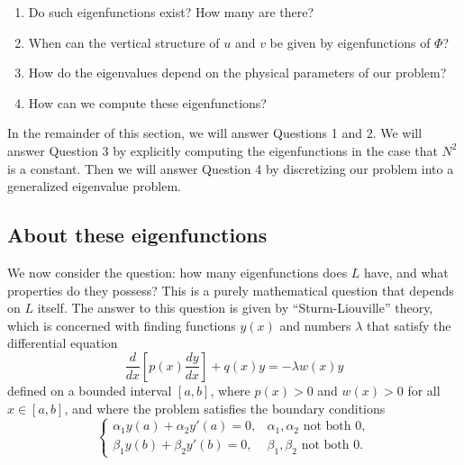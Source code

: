 \documentclass{article}
\numberwithin{equation}{section}
\begin{document}
\begin{enumerate}
  \item Do such eigenfunctions exist? How many are there?
  \item When can the vertical structure of $u$ and $v$ be given by eigenfunctions of $\Phi$?
  \item How do the eigenvalues depend on the physical parameters of our problem?
  \item How can we compute these eigenfunctions?
\end{enumerate}
In the remainder of this section, we will answer Questions 1 and 2. We will answer Question 3 by explicitly computing the eigenfunctions in the case that $N^2$ is a constant. Then we will answer Question 4 by discretizing our problem into a generalized eigenvalue problem. 
%
\subsection{About these eigenfunctions}
We now consider the question: how many eigenfunctions does $L$ have, and what properties do they possess? This is a purely mathematical question that depends on $L$ itself. The answer to this question is given by ``Sturm-Liouville'' theory, which is concerned with finding functions $y(x)$ and numbers $\lambda$ that satisfy the differential equation
\begin{equation}
  \label{eq:sturm_liouville}
  \frac{d}{dx}\left[p(x)\frac{dy}{dx}\right] + q(x)y = -\lambda w(x) y
\end{equation}
defined on a bounded interval $[a, b]$, where $p(x)>0$ and $w(x)>0$ for all $x\in[a,b]$, and where the problem satisfies the boundary conditions
\begin{equation}
  \label{eq:robin_conditions}
 \begin{cases}
\alpha_1 y(a) + \alpha_2 y'(a) = 0, 
& \alpha_1,\alpha_2 \text{ not both } 0, \\[4pt]
\beta_1 y(b) + \beta_2 y'(b) = 0, 
& \beta_1,\beta_2 \text{ not both } 0.
\end{cases}
\end{equation}
\end{document}
